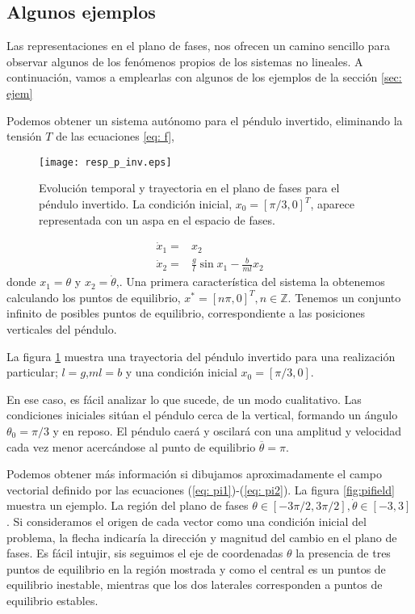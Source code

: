 \subsection{Algunos ejemplos}
Las representaciones en el plano de fases, nos ofrecen un camino sencillo para observar algunos de los fenómenos propios de los sistemas no lineales. A continuación, vamos a emplearlas con algunos de los ejemplos de la sección \ref{sec: ejem}
\begin{example}
Podemos obtener un sistema autónomo para el péndulo invertido, eliminando la tensión $T$ de las ecuaciones \ref{eq: f},
\begin{figure}
\texttt{[image: resp\_p\_inv.eps]}
\caption{Evolución temporal y trayectoria en el plano de fases para el péndulo invertido. La condición inicial, $x_0=[\pi/3,0]^T$, aparece representada con un aspa en el espacio de fases.} \label{fig:trpen}
\end{figure}

\begin{align}
\dot x_1 = &x_2 \label{eq: pi1} \\ 
\dot x_2 = &\frac{g}{l}\sin x_1 - \frac{b}{ml}x_2 \label{eq: pi2}
\end{align}
donde $x_1 = \theta$ y $x_2 = \dot \theta$,. Una primera característica del sistema la obtenemos calculando los puntos de equilibrio, $x^*=[n\pi,0]^T, n \in \mathbb{Z}$. Tenemos un conjunto infinito de posibles puntos de equilibrio, correspondiente a las posiciones verticales del péndulo.

La figura \ref{fig:trpen} muestra una trayectoria del péndulo invertido para una realización particular; $l=g$,$ml=b$ y una condición inicial $x_0=[\pi/3,0]$. 

En ese caso, es fácil analizar lo que sucede, de un modo cualitativo. Las condiciones iniciales sitúan el péndulo cerca de la vertical, formando un ángulo $\theta_0 =\pi/3$ y en reposo. El péndulo caerá y oscilará con una amplitud y velocidad cada vez menor acercándose al punto de equilibrio $\overline \theta = \pi$.

Podemos obtener más información si dibujamos aproximadamente el campo vectorial definido por las ecuaciones (\ref{eq: pi1})-(\ref{eq: pi2}). La figura \ref{fig:pifield} muestra un ejemplo. La región del plano de fases $\theta \in [-3\pi/2,3\pi/2], \dot \theta \in [-3,3]$. Si consideramos el origen de cada vector como una condición inicial del problema, la flecha indicaría la dirección y magnitud del cambio en el plano de fases.  Es fácil intujir, sis seguimos el eje de coordenadas $\theta$ la presencia de tres  puntos de equilibrio en la región mostrada y como el central es un puntos de equilibrio inestable, mientras que los dos laterales corresponden a puntos de equilibrio estables.


\end{example}
